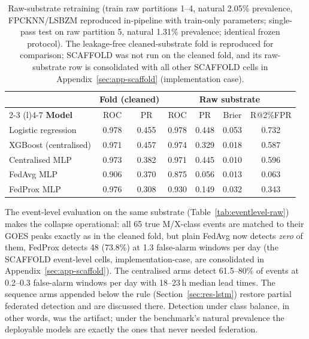 \begin{table}[t]
\centering
\caption{Raw-substrate retraining (train raw partitions 1--4,
natural 2.05\% prevalence, FPCKNN/LSBZM reproduced in-pipeline with
train-only parameters; single-pass test on raw partition 5, natural
1.31\% prevalence; identical frozen protocol). The leakage-free
cleaned-substrate fold is reproduced for comparison; SCAFFOLD was
not run on the cleaned fold, and its raw-substrate row is
consolidated with all other SCAFFOLD cells in
Appendix~\ref{sec:app-scaffold} (implementation case).}
\label{tab:rawsubstr}
\small
\begin{tabular}{@{}l c c c c c c@{}}
\toprule
 & \multicolumn{2}{c}{\textbf{Fold (cleaned)}} &
 \multicolumn{4}{c}{\textbf{Raw substrate}} \\
\cmidrule(r){2-3} \cmidrule(l){4-7}
\textbf{Model} & ROC & PR & ROC & PR & Brier & R@2\%FPR \\
\midrule
Logistic regression & 0.978 & 0.455 & 0.978 & 0.448 & 0.053 & 0.732 \\
XGBoost (centralised) & 0.971 & 0.457 & 0.974 & 0.329 & 0.018 & 0.587 \\
Centralised MLP & 0.973 & 0.382 & 0.971 & 0.445 & 0.010 & 0.596 \\
FedAvg MLP & 0.906 & 0.370 & 0.875 & 0.056 & 0.013 & 0.063 \\
FedProx MLP & 0.976 & 0.308 & 0.930 & 0.149 & 0.032 & 0.343 \\
\bottomrule
\end{tabular}
\end{table}

The event-level evaluation on the same substrate
(Table~\ref{tab:eventlevel-raw}) makes the collapse operational: all
65 true M/X-class events are matched to their GOES peaks exactly as
in the cleaned fold, but plain FedAvg now detects \emph{zero} of
them, FedProx detects 48 (73.8\%) at 1.3 false-alarm windows per
day (the SCAFFOLD event-level cells, implementation-case, are
consolidated in Appendix~\ref{sec:app-scaffold}). The
centralised arms detect 61.5--80\% of events at
0.2--0.3 false-alarm windows per day with 18--23\,h median lead
times. The sequence arms appended below the rule
(Section~\ref{sec:res-lstm}) restore partial federated detection
and are discussed there. Detection under class balance, in other
words, was the
artifact; under the benchmark's natural prevalence the deployable
models are exactly the ones that never needed federation.

